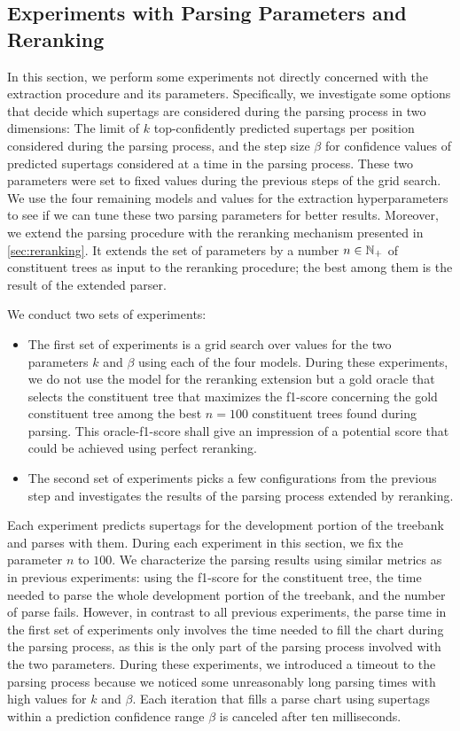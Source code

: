 \documentclass[../../document.tex]{subfiles}
\begin{document}
    \subsection{Experiments with Parsing Parameters and Reranking}\label{sec:gridsearch:reranking}
    In this section, we perform some experiments not directly concerned with the extraction procedure and its parameters.
    Specifically, we investigate some options that decide which supertags are considered during the parsing process in two dimensions:
        The limit of \(k\) top-confidently predicted supertags per position considered during the parsing process, and the step size \(\beta\) for confidence values of predicted supertags considered at a time in the parsing process.
    These two parameters were set to fixed values during the previous steps of the grid search.
    We use the four remaining models and values for the extraction hyperparameters to see if we can tune these two parsing parameters for better results.
    Moreover, we extend the parsing procedure with the reranking mechanism presented in \cref{sec:reranking}.
    It extends the set of parameters by a number \(n\in\mathbb{N}_+\) of constituent trees as input to the reranking procedure; the best among them is the result of the extended parser.

    We conduct two sets of experiments:
    \begin{itemize}
        \item The first set of experiments is a grid search over values for the two parameters \(k\) and \(\beta\) using each of the four models. During these experiments, we do not use the  model for the reranking extension but a gold oracle that selects the constituent tree that maximizes the f1-score concerning the gold constituent tree among the best \(n = 100\) constituent trees found during parsing. This oracle-f1-score shall give an impression of a potential score that could be achieved using perfect reranking.
        \item The second set of experiments picks a few configurations from the previous step and investigates the results of the parsing process extended by reranking.
    \end{itemize}
    Each experiment predicts supertags for the development portion of the treebank and parses with them.
    During each experiment in this section, we fix the parameter \(n\) to \(100\).
    We characterize the parsing results using similar metrics as in previous experiments: using the f1-score for the constituent tree, the time needed to parse the whole development portion of the treebank, and the number of parse fails.
    However, in contrast to all previous experiments, the parse time in the first set of experiments only involves the time needed to fill the chart during the parsing process, as this is the only part of the parsing process involved with the two parameters.
    During these experiments, we introduced a timeout to the parsing process because we noticed some unreasonably long parsing times with high values for \(k\) and \(\beta\). Each iteration that fills a parse chart using supertags within a prediction confidence range \(\beta\) is canceled after ten milliseconds.
\end{document}

